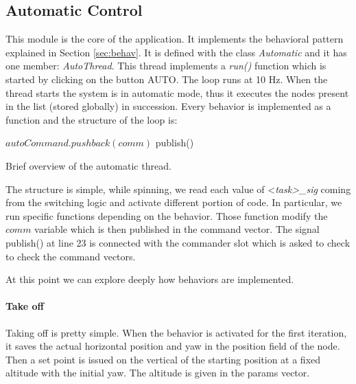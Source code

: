 \subsection{Automatic Control}
\label{sec:auto}
This module is the core of the application. It implements the behavioral pattern explained in Section \ref{sec:behav}. It is defined with the class \textit{Automatic} and it has one member: \textit{AutoThread}. This thread implements a \textit{run()} function which is started by clicking on the button AUTO. The loop runs at 10 Hz. When the thread starts the system is in automatic mode, thus it executes the nodes present in the list (stored globally) in succession. Every behavior is implemented as a function and the structure of the loop is:
\begin{algorithm}
\begin{algorithmic} [1]
 
\ENDIF
{}			  
\ENDIF
{}			  
\ENDIF
{}		  
\ENDIF
{}			  
\ENDIF
{}			  
\ENDIF
\STATE $autoCommand.pushback(comm)$ 
\STATE publish()
\ENDWHILE
\end{algorithmic}
\label{alg:autothread}
\caption{Brief overview of the automatic thread.}
\end{algorithm}
The structure is simple, while spinning, we read each value of <\textit{task>\_sig} coming from the switching logic and activate different portion of code. In particular, we run specific functions depending on the behavior. Those function modify the $comm$ variable which is then published in the command vector. The signal publish() at line 23 is connected with the commander slot which is asked to check to check the command vectors. 

At this point we can explore deeply how behaviors are implemented.

\paragraph{Take off} Taking off is pretty simple. When the behavior is activated for the first iteration, it saves the actual horizontal position and yaw in the position field of the node. Then a set point is issued on the vertical of the starting position at a fixed altitude with the initial yaw. The altitude is given in the params vector.

